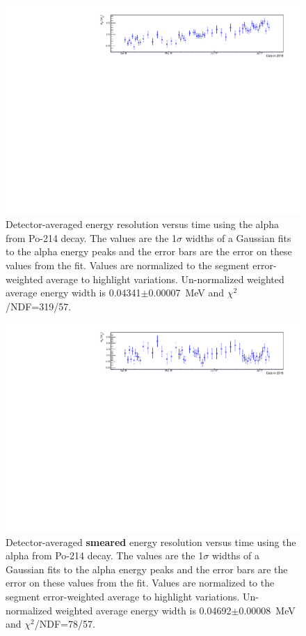 \clearpage
\newpage
\begin{figure}[!h]
\centering
\includegraphics[width=1.05\textwidth]{figures/PubBiPo214EresvsT.pdf}
\caption{\label{fig:EresvsT214}Detector-averaged energy resolution versus time using the alpha from Po-214 decay. The values are the 1$\sigma$ widths of a Gaussian fits to the alpha energy peaks and the error bars are the error on these values from the fit. Values are normalized to the segment error-weighted average to highlight variations. Un-normalized weighted average energy width is 0.04341$\pm$0.00007~MeV and $\chi^2$/NDF=319/57.}
\end{figure}
\begin{figure}[!h]
\centering
\includegraphics[width=1.05\textwidth]{figures/PubBiPo214EsmearresvsT.pdf}
\caption{\label{fig:EsmearresvsT214}Detector-averaged {\bf smeared} energy resolution versus time using the alpha from Po-214 decay. The values are the 1$\sigma$ widths of a Gaussian fits to the alpha energy peaks and the error bars are the error on these values from the fit. Values are normalized to the segment error-weighted average to highlight variations. Un-normalized weighted average energy width is 0.04692$\pm$0.00008~MeV and $\chi^2$/NDF=78/57.}
\end{figure}
\clearpage
\newpage
